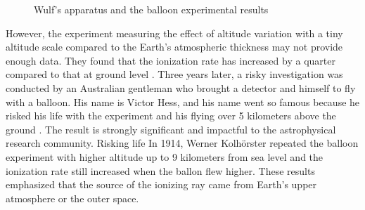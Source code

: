 \begin{figure}[h!]
    \centering
        \hfill
        \caption{Wulf's apparatus and the balloon experimental results}
       \label{fig:xxx}
\end{figure}


However, the experiment measuring the effect of altitude
variation with a tiny altitude scale compared to the Earth's
atmospheric thickness may not provide enough data.
They found that the ionization rate
has increased by a quarter compared to that at ground level
\citep{de2014atmospheric}.
Three years later, a risky investigation was conducted by 
an Australian gentleman who brought a detector and himself
to fly with a balloon.
His name is Victor Hess, and his name went so famous
because he risked his life with the experiment 
and his flying over 5 kilometers above the ground \citep{hess1912beobachtungen}.
The result is strongly significant and impactful
to the astrophysical research community. Risking life  
In 1914, Werner Kolhörster repeated the balloon experiment 
with higher altitude up to 9 kilometers from 
sea level and the ionization rate still increased when 
the ballon flew higher. These results emphasized that the source of 
the ionizing ray came from Earth's upper atmosphere
or the outer space.

